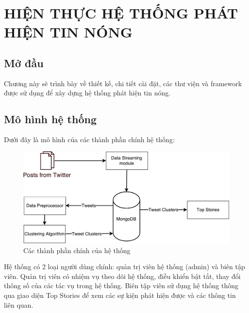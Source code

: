 \chapter{HIỆN THỰC HỆ THỐNG PHÁT HIỆN TIN NÓNG}
\ifpdf
    \graphicspath{{Chapter3/Chapter3Figs/PNG/}{Chapter3/Chapter3Figs/PDF/}{Chapter3/Chapter3Figs/}}
\else
    \graphicspath{{Chapter3/Chapter3Figs/EPS/}{Chapter3/Chapter3Figs/}}
\fi

\section{Mở đầu}
Chương này sẽ trình bày về thiết kế, chi tiết cài đặt, các thư viện và framework được sử dụng để xây dựng hệ thống phát hiện tin nóng.

\section{Mô hình hệ thống}
Dưới đây là mô hình của các thành phần chính hệ thống:
\begin{figure}[H]
	\centering
	\includegraphics[width=0.9\linewidth]{Chapter3/Chapter3Figs/PDF/SystemArchitecture}
	\caption{Các thành phần chính của hệ thống}
	\label{fig:systemarchitecture}
\end{figure}

Hệ thống có 2 loại người dùng chính: quản trị viên hệ thống (admin) và biên tập viên. Quản trị viên có nhiệm vụ theo dõi hệ thống, điều khiển bật tắt, thay đổi thông số của các tác vụ trong hệ thống. Biên tập viên sử dụng hệ thống thông qua giao diện Top Stories để xem các sự kiện phát hiện được và các thông tin liên quan.

